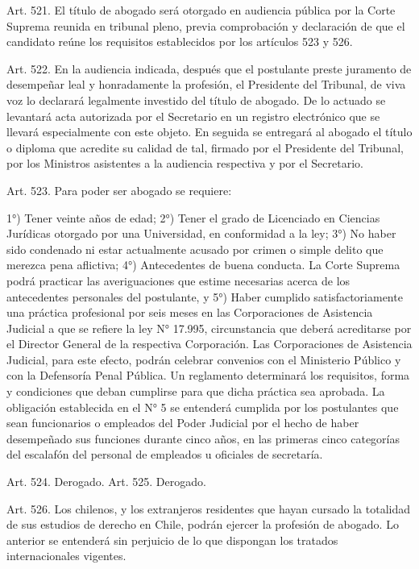     Art. 521. El título de abogado será otorgado en audiencia pública por la Corte Suprema reunida en tribunal pleno, previa comprobación y declaración de que el candidato reúne los requisitos establecidos por los artículos 523 y 526.


    Art. 522. En la audiencia indicada, después que el postulante preste juramento de desempeñar leal y honradamente la profesión, el Presidente del Tribunal, de viva voz lo declarará legalmente investido del título de abogado.
    De lo actuado se levantará acta autorizada por el Secretario en un registro electrónico que se llevará especialmente con este objeto.
    En seguida se entregará al abogado el título o diploma que acredite su calidad de tal, firmado por el Presidente del Tribunal, por los Ministros asistentes a la audiencia respectiva y por el Secretario.
   



    Art. 523. Para poder ser abogado se requiere:

    1°) Tener veinte años de edad;
    2°) Tener el grado de Licenciado en Ciencias Jurídicas otorgado por una Universidad, en conformidad a la ley;
    3°) No haber sido condenado ni estar actualmente acusado por crimen o simple delito que merezca pena aflictiva;
    4°) Antecedentes de buena conducta.
    La Corte Suprema podrá practicar las averiguaciones que estime necesarias acerca de los antecedentes personales del postulante, y
    5°) Haber cumplido satisfactoriamente una práctica profesional por seis meses en las Corporaciones de Asistencia Judicial a que se refiere la ley N° 17.995, circunstancia que deberá acreditarse por el Director General de la respectiva Corporación. Las Corporaciones de Asistencia Judicial, para este efecto, podrán celebrar convenios con el Ministerio Público y con la Defensoría Penal Pública.
    Un reglamento determinará los requisitos, forma y condiciones que deban cumplirse para que dicha práctica sea aprobada.
    La obligación establecida en el N° 5 se entenderá cumplida por los postulantes que sean funcionarios o empleados del Poder Judicial por el hecho de haber desempeñado sus funciones durante cinco años, en las primeras cinco categorías del escalafón del personal de empleados u oficiales de secretaría.


    Art. 524. Derogado.
    Art. 525. Derogado.

    Art. 526. Los chilenos, y los extranjeros residentes que hayan cursado la totalidad de sus estudios de derecho en Chile, podrán ejercer la profesión de abogado. Lo anterior se entenderá sin perjuicio de lo que dispongan los tratados internacionales vigentes.


